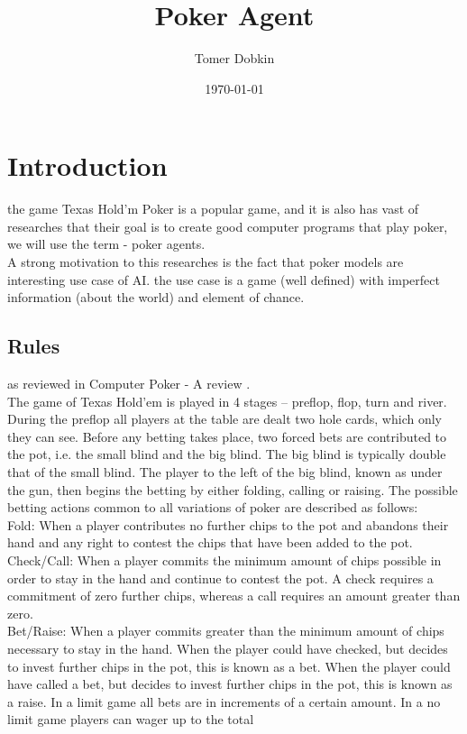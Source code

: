 \documentclass{article}
\title{Poker Agent}
\author{Tomer Dobkin}
\date{\today}
\begin{document}
\maketitle
\section{Introduction}
the game Texas Hold'm Poker is a popular game, and it is also has vast of researches that their goal is to create good computer programs that play poker, we will use the term -  poker agents.\\
A strong motivation to this researches is the fact that  poker models are interesting use case of AI. the use case is a game (well defined) with imperfect information (about the world) and element of chance.
\subsection{Rules}
as reviewed in Computer Poker - A review \cite{review}.\\
The game of Texas Hold’em is played in 4 stages – preflop, flop, turn and river. During the preflop all players at the
table are dealt two hole cards, which only they can see. Before any betting takes place, two forced bets are contributed to
the pot, i.e. the small blind and the big blind. The big blind is typically double that of the small blind. The player to the left
of the big blind, known as under the gun, then begins the betting by either folding, calling or raising. The possible betting
actions common to all variations of poker are described as follows:\\
Fold: When a player contributes no further chips to the pot and abandons their hand and any right to contest the chips
that have been added to the pot.\\
Check/Call: When a player commits the minimum amount of chips possible in order to stay in the hand and continue to
contest the pot. A check requires a commitment of zero further chips, whereas a call requires an amount greater
than zero.\\
Bet/Raise: When a player commits greater than the minimum amount of chips necessary to stay in the hand. When the
player could have checked, but decides to invest further chips in the pot, this is known as a bet. When the player
could have called a bet, but decides to invest further chips in the pot, this is known as a raise.
In a limit game all bets are in increments of a certain amount. In a no limit game players can wager up to the total
\end{document}
